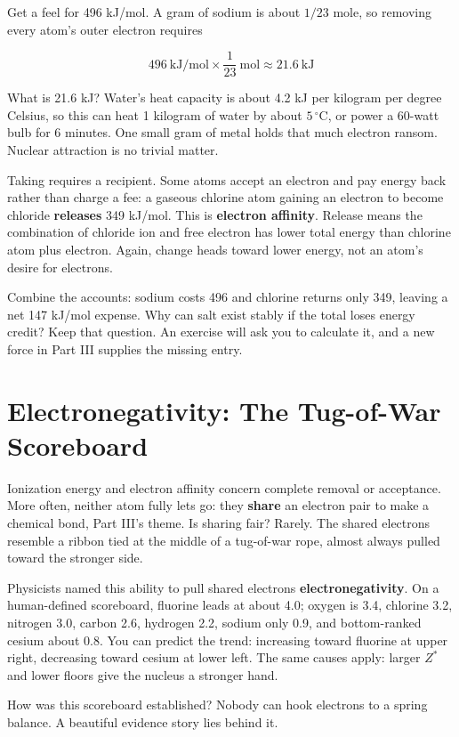 Get a feel for 496 kJ/mol. A gram of sodium is about $1/23$ mole, so removing every atom's outer electron requires

\[496\ \mathrm{kJ/mol} \times \frac{1}{23}\ \mathrm{mol} \approx 21.6\ \mathrm{kJ}\]

What is 21.6 kJ? Water's heat capacity is about 4.2 kJ per kilogram per degree Celsius, so this can heat 1 kilogram of water by about $5\,^{\circ}\mathrm{C}$, or power a 60-watt bulb for 6 minutes. One small gram of metal holds that much electron ransom. Nuclear attraction is no trivial matter.

Taking requires a recipient. Some atoms accept an electron and pay energy back rather than charge a fee: a gaseous chlorine atom gaining an electron to become chloride \textbf{releases} 349 kJ/mol. This is \textbf{electron affinity}. Release means the combination of chloride ion and free electron has lower total energy than chlorine atom plus electron. Again, change heads toward lower energy, not an atom's desire for electrons.

Combine the accounts: sodium costs 496 and chlorine returns only 349, leaving a net 147 kJ/mol expense. Why can salt exist stably if the total loses energy credit? Keep that question. An exercise will ask you to calculate it, and a new force in Part III supplies the missing entry.

\section{Electronegativity: The Tug-of-War Scoreboard}

Ionization energy and electron affinity concern complete removal or acceptance. More often, neither atom fully lets go: they \textbf{share} an electron pair to make a chemical bond, Part III's theme. Is sharing fair? Rarely. The shared electrons resemble a ribbon tied at the middle of a tug-of-war rope, almost always pulled toward the stronger side.

Physicists named this ability to pull shared electrons \textbf{electronegativity}. On a human-defined scoreboard, fluorine leads at about 4.0; oxygen is 3.4, chlorine 3.2, nitrogen 3.0, carbon 2.6, hydrogen 2.2, sodium only 0.9, and bottom-ranked cesium about 0.8. You can predict the trend: increasing toward fluorine at upper right, decreasing toward cesium at lower left. The same causes apply: larger $Z^{*}$ and lower floors give the nucleus a stronger hand.

How was this scoreboard established? Nobody can hook electrons to a spring balance. A beautiful evidence story lies behind it.

